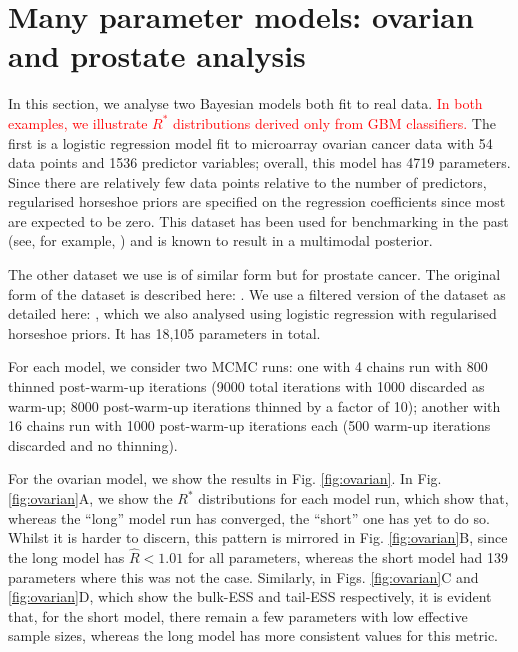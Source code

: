 \documentclass{article}
\begin{document}
\section{Many parameter models: ovarian and prostate analysis}\label{sec:prostate}
In this section, we analyse two Bayesian models both fit to real data. \textcolor{red}{In both examples, we illustrate $R^*$ distributions derived only from GBM classifiers.} The first is a logistic regression model fit to microarray ovarian cancer data with 54 data points and 1536 predictor variables; overall, this model has 4719 parameters. Since there are relatively few data points relative to the number of predictors, regularised horseshoe priors are specified on the regression coefficients \citep{piironen2017sparsity} since most are expected to be zero. This dataset has been used for benchmarking in the past (see, for example, \cite{schummer1999comparative,hernandez2010expectation,paananen2019implicitly}) and is known to result in a multimodal posterior.

The other dataset we use is of similar form but for prostate cancer. The original form of the dataset is described here: \cite{singh2002gene}. We use a filtered version of the dataset as detailed here: \cite{yang2006stable}, which we also analysed using logistic regression with regularised horseshoe priors. It has 18,105 parameters in total. 

For each model, we consider two MCMC runs: one with 4 chains run with 800 thinned post-warm-up iterations (9000 total iterations with 1000 discarded as warm-up; 8000 post-warm-up iterations thinned by a factor of 10); another with 16 chains run with 1000 post-warm-up iterations each (500 warm-up iterations discarded and no thinning).

For the ovarian model, we show the results in Fig. \ref{fig:ovarian}. In Fig. \ref{fig:ovarian}A, we show the $R^*$ distributions for each model run, which show that, whereas the ``long'' model run has converged, the ``short'' one has yet to do so. Whilst it is harder to discern, this pattern is mirrored in Fig. \ref{fig:ovarian}B, since the long model has $\widehat{R}<1.01$ for all parameters, whereas the short model had 139 parameters where this was not the case. Similarly, in Figs. \ref{fig:ovarian}C and \ref{fig:ovarian}D, which show the bulk-ESS and tail-ESS respectively, it is evident that, for the short model, there remain a few parameters with low effective sample sizes, whereas the long model has more consistent values for this metric.
\end{document}

